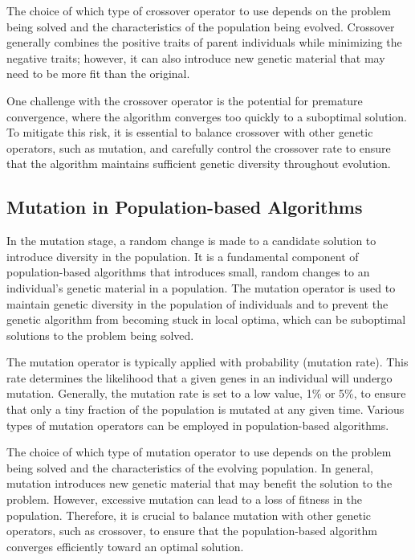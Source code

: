 \documentclass[runningheads]{llncs}
\begin{document}
The choice of which type of crossover operator to use depends on the problem being solved and the characteristics of the population being evolved. Crossover generally combines the positive traits of parent individuals while minimizing the negative traits; however, it can also introduce new genetic material that may need to be more fit than the original.

One challenge with the crossover operator is the potential for premature convergence, where the algorithm converges too quickly to a suboptimal solution. To mitigate this risk, it is essential to balance crossover with other genetic operators, such as mutation, and carefully control the crossover rate to ensure that the algorithm maintains sufficient genetic diversity throughout evolution.

\subsection{Mutation in Population-based Algorithms}

In the mutation stage, a random change is made to a candidate solution to introduce diversity in the population. It is a fundamental component of population-based algorithms that introduces small, random changes to an individual's genetic material in a population. The mutation operator is used to maintain genetic diversity in the population of individuals and to prevent the genetic algorithm from becoming stuck in local optima, which can be suboptimal solutions to the problem being solved.

The mutation operator is typically applied with probability (mutation rate)\cite{Greenwell-1995}. This rate determines the likelihood that a given genes in an individual will undergo mutation. Generally, the mutation rate is set to a low value, 1\% or 5\%, to ensure that only a tiny fraction of the population is mutated at any given time. Various types of mutation operators can be employed in population-based algorithms.

The choice of which type of mutation operator to use depends on the problem being solved and the characteristics of the evolving population. In general, mutation introduces new genetic material that may benefit the solution to the problem. However, excessive mutation can lead to a loss of fitness in the population. Therefore, it is crucial to balance mutation with other genetic operators, such as crossover, to ensure that the population-based algorithm converges efficiently toward an optimal solution.
\end{document}
